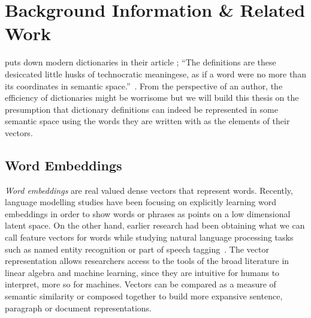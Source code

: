 
\chapter{Background Information \& Related Work}%
\label{chap:background_n_related}

\citeauthor{somers_youre_2014} puts down modern dictionaries in their article ;
\enquote{The definitions are these desiccated little husks of technocratic meaningese, as if a word were no more than its coordinates in semantic space.}~\cite{somers_youre_2014}.
From the perspective of an author, the efficiency of dictionaries might be worrisome but we will build this thesis on the presumption that dictionary definitions can indeed be represented in some semantic space using the words they are written with as the elements of their vectors.

\section{Word Embeddings}%
\label{sec:word_embeddings}


\emph{Word embeddings} are real valued dense vectors that represent words.
Recently, language modelling studies have been focusing on explicitly learning word embeddings in order to show words or phrases as points on a low dimensional latent space.
On the other hand, earlier research had been obtaining what we can call feature vectors for words while studying natural language processing tasks such as named entity recognition or part of speech tagging~\cite{almeida_word_2019, collobert_unified_2008}.
The vector representation allows researchers access to the tools of the broad literature in linear algebra and machine learning, since they are intuitive for humans to interpret, more so for machines.
Vectors can be compared as a measure of semantic similarity or composed together to build more expansive sentence, paragraph or document representations.


